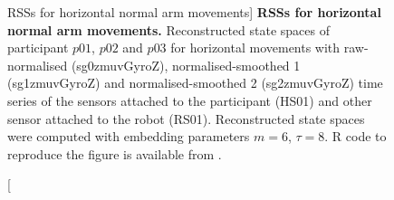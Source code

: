 \begin{figure}
\caption
	[RSSs for horizontal normal arm movements]{
	{\bf RSSs for horizontal normal arm movements.}
	Reconstructed state spaces %
	of participant $p01$, $p02$ and $p03$ for horizontal movements 
	with raw-normalised (sg0zmuvGyroZ), 
	normalised-smoothed 1 (sg1zmuvGyroZ) and 
	normalised-smoothed 2 (sg2zmuvGyroZ) time series of the 
	sensors attached to the participant (HS01) and other sensor 
	attached to the robot (RS01).	
	Reconstructed state spaces were computed with 
	embedding parameters $m=6$, $\tau=8$.
	R code to reproduce the figure is available from \cite{xochicale2018}.
        }
    \label{fig:rss_HN}
\end{figure}

